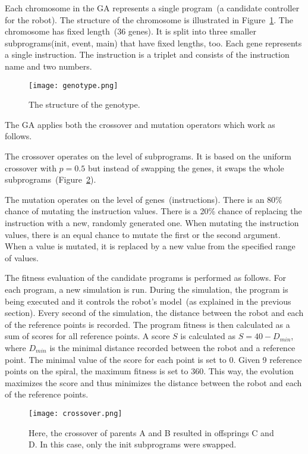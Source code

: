 \documentclass{ExcelAtFIT}
\begin{document}
Each chromosome in the GA represents a single program~(a candidate controller for the robot).
The structure of the chromosome is illustrated in Figure~\ref{fig:Genotype}.
The chromosome has fixed length~(36 genes).
It is split into three smaller subprograms(init, event, main) that have fixed lengths, too.
Each gene represents a single instruction.
The instruction is a triplet and consists of the instruction name and two numbers.

\begin{figure}[h]
	\centering
	{\texttt{[image: genotype.png]}}
	\caption{
		The structure of the genotype.
	}
	\label{fig:Genotype}
\end{figure}

The GA applies both the crossover and mutation operators which work as follows.

The crossover operates on the level of subprograms.
It is based on the uniform crossover with $p = 0.5$ but instead of swapping the genes, it swaps the whole subprograms~(Figure~\ref{fig:Crossover}).

The mutation operates on the level of genes~(instructions).
There is an 80\% chance of mutating the instruction values.
There is a 20\% chance of replacing the instruction with a new, randomly generated one.
When mutating the instruction values, there is an equal chance to mutate the first or the second argument.
When a value is mutated, it is replaced by a new value from the specified range of values.

The fitness evaluation of the candidate programs is performed as follows.
For each program, a new simulation is run.
During the simulation, the program is being executed and it controls the robot's model~(as explained in the previous section).
Every second of the simulation, the distance between the robot and each of the reference points is recorded.
The program fitness is then calculated as a sum of scores for all reference points.
A score $S$ is calculated as $S = 40 - D_{min}$, where $D_{min}$ is the minimal distance recorded between the robot and a reference point.
The minimal value of the score for each point is set to 0.
Given 9 reference points on the spiral, the maximum fitness is set to 360.
This way, the evolution maximizes the score and thus minimizes the distance between the robot and each of the reference points.

\begin{figure}[h]
	\centering
	{\texttt{[image: crossover.png]}}
	\caption{
	Here, the crossover of parents A and B resulted in offsprings C and D.
	In this case, only the init subprograms were swapped.
	}
	\label{fig:Crossover}
\end{figure}
\end{document}
